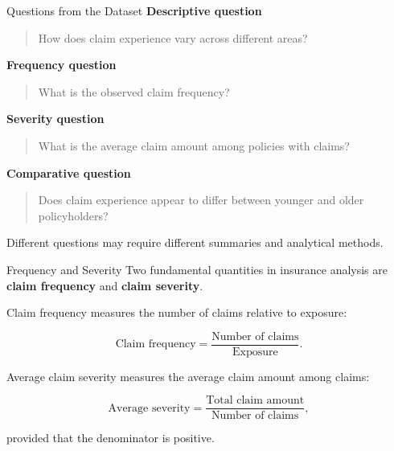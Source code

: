 \documentclass[
  ignorenonframetext,
  aspectratio=169,
]{beamer}
\begin{document}
\begin{frame}{Questions from the Dataset}
\protect{}\label{questions-from-the-dataset}
\textbf{Descriptive question}

\begin{quote}
How does claim experience vary across different areas?
\end{quote}

\textbf{Frequency question}

\begin{quote}
What is the observed claim frequency?
\end{quote}

\textbf{Severity question}

\begin{quote}
What is the average claim amount among policies with claims?
\end{quote}

\textbf{Comparative question}

\begin{quote}
Does claim experience appear to differ between younger and older
policyholders?
\end{quote}

Different questions may require different summaries and analytical
methods.
\end{frame}

\begin{frame}{Frequency and Severity}
\protect{}\label{frequency-and-severity}
Two fundamental quantities in insurance analysis are \textbf{claim
frequency} and \textbf{claim severity}.

Claim frequency measures the number of claims relative to exposure:

\[
\text{Claim frequency}
=\frac{\text{Number of claims}}
{\text{Exposure}}.
\]

Average claim severity measures the average claim amount among claims:

\[
\text{Average severity}
=\frac{\text{Total claim amount}}
{\text{Number of claims}},
\]

provided that the denominator is positive.
\end{frame}
\end{document}
